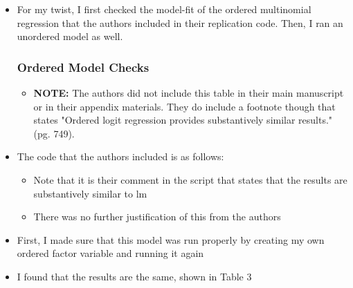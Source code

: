 \documentclass[12pt,letterpaper]{article}
\begin{document}
	\begin{itemize}
		\item For my twist, I first checked the model-fit of the ordered multinomial regression that the authors included in their replication code. Then, I ran an unordered model as well.
		\subsubsection{Ordered Model Checks}
			\begin{itemize}
				\item \textbf{NOTE:} The authors did not include this table in their main manuscript or in their appendix materials. They do include a footnote though that states "Ordered logit regression provides substantively similar results." (pg. 749).
			\end{itemize} 
		\item The code that the authors included is as follows: 
		
			\begin{itemize}
				\item Note that it is their comment in the script that states that the results are substantively similar to lm
				\item There was no further justification of this from the authors
			\end{itemize}
		\item First, I made sure that this model was run properly by creating my own ordered factor variable and running it again
		
		\item I found that the results are the same, shown in Table 3
		\end{itemize}
		
		
		
\end{document}

